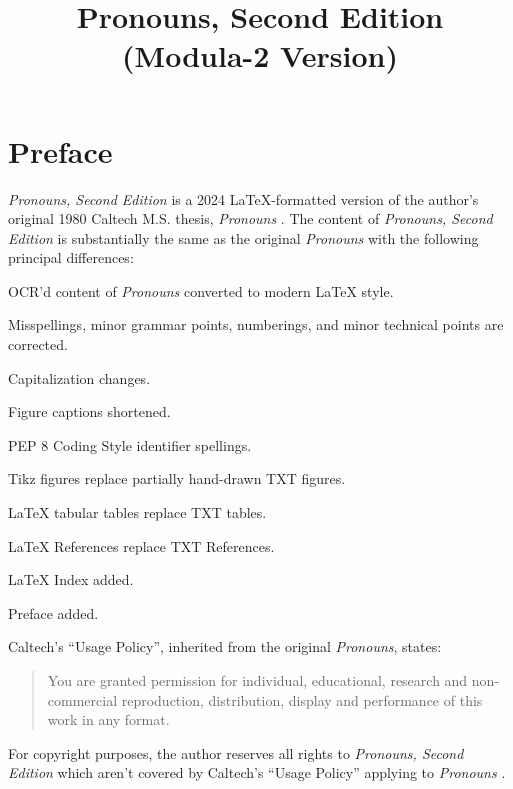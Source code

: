 \documentclass{article}
\begin{document}
%
%

\title{\textbf{Pronouns, Second Edition\\(Modula-2 Version)}}
\maketitle
\tableofcontents

%
%

\clearpage
\section*{Preface}

\textit{Pronouns, Second Edition} is a 2024 LaTeX-formatted
version of the author's original 1980 Caltech M.S. thesis,
\textit{Pronouns} \cite{Pronouns}.  The content of
\textit{Pronouns, Second Edition} is substantially the same as
the original \textit{Pronouns} with the following principal
differences:
\begin{itemize*}
\item OCR'd content of \textit{Pronouns} converted to
modern LaTeX style.
\item Misspellings, minor grammar points, numberings,
and minor technical points are corrected.
\item Capitalization changes.
\item Figure captions shortened.
\item PEP 8 Coding Style identifier spellings.
\item Tikz figures replace partially hand-drawn TXT figures.
\item LaTeX tabular tables replace TXT tables.
\item LaTeX References replace TXT References.
\item LaTeX Index added.
\item Preface added.
\end{itemize*}

Caltech's ``Usage Policy'', inherited from the original
\textit{Pronouns}, states:
\begin{quote}
You are granted permission for individual, educational, research
and non-commercial reproduction, distribution, display and performance
of this work in any format.
\end{quote}
\noindent For copyright purposes, the author reserves all rights
to \textit{Pronouns, Second Edition} which aren't
covered by Caltech's ``Usage Policy'' applying to
\textit{Pronouns} \cite{Pronouns}.
\end{document}
